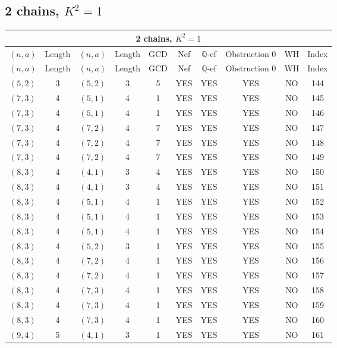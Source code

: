 \subsection{2 chains, $K^2 = 1$}
\begin{longtable}{|c|c|c|c|c|c|c|c|c|c|}
\hline
\multicolumn{10}{|c|}{2 chains, $K^2 = 1$}\\
\hline
$(n,a)$ & Length & $(n,a)$ & Length & GCD & Nef & $\mathbb Q$-ef & Obstruction 0 & WH & Index\\
\hline
\endfirsthead

\hline
$(n,a)$ & Length & $(n,a)$ & Length & GCD & Nef & $\mathbb Q$-ef & Obstruction 0 & WH & Index\\
\hline
\endhead
\hline
\endfoot

$(5, 2)$ & 3 & $(5, 2)$ & 3 & 5 & YES & YES & YES & NO & 144\\
$(7, 3)$ & 4 & $(5, 1)$ & 4 & 1 & YES & YES & YES & NO & 145\\
$(7, 3)$ & 4 & $(5, 1)$ & 4 & 1 & YES & YES & YES & NO & 146\\
$(7, 3)$ & 4 & $(7, 2)$ & 4 & 7 & YES & YES & YES & NO & 147\\
$(7, 3)$ & 4 & $(7, 2)$ & 4 & 7 & YES & YES & YES & NO & 148\\
$(7, 3)$ & 4 & $(7, 2)$ & 4 & 7 & YES & YES & YES & NO & 149\\
$(8, 3)$ & 4 & $(4, 1)$ & 3 & 4 & YES & YES & YES & NO & 150\\
$(8, 3)$ & 4 & $(4, 1)$ & 3 & 4 & YES & YES & YES & NO & 151\\
$(8, 3)$ & 4 & $(5, 1)$ & 4 & 1 & YES & YES & YES & NO & 152\\
$(8, 3)$ & 4 & $(5, 1)$ & 4 & 1 & YES & YES & YES & NO & 153\\
$(8, 3)$ & 4 & $(5, 1)$ & 4 & 1 & YES & YES & YES & NO & 154\\
$(8, 3)$ & 4 & $(5, 2)$ & 3 & 1 & YES & YES & YES & NO & 155\\
$(8, 3)$ & 4 & $(7, 2)$ & 4 & 1 & YES & YES & YES & NO & 156\\
$(8, 3)$ & 4 & $(7, 2)$ & 4 & 1 & YES & YES & YES & NO & 157\\
$(8, 3)$ & 4 & $(7, 3)$ & 4 & 1 & YES & YES & YES & NO & 158\\
$(8, 3)$ & 4 & $(7, 3)$ & 4 & 1 & YES & YES & YES & NO & 159\\
$(8, 3)$ & 4 & $(7, 3)$ & 4 & 1 & YES & YES & YES & NO & 160\\
$(9, 4)$ & 5 & $(4, 1)$ & 3 & 1 & YES & YES & YES & NO & 161\\

\end{longtable}

